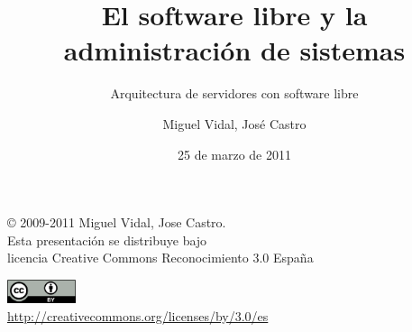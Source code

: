 \documentclass{beamer}
\begin{document}
\title{El software libre y la administración de sistemas}
\subtitle{Arquitectura de servidores con software libre}
\author{Miguel Vidal, José Castro}
\date{25 de marzo de 2011}


\begin{frame}
  \vspace{2cm}
  \begin{flushright}
    {\footnotesize \copyright{} 2009-2011 Miguel Vidal, Jose Castro.} \\
    \medskip
    {\scriptsize Esta presentación se distribuye bajo \\ licencia Creative Commons Reconocimiento 3.0 España}
  \end{flushright}
  \begin{center}
    \href{http://creativecommons.org/licenses/by/3.0/es}{\includegraphics[width=2cm]{format/cc-by.png}} \\
    {\tiny \url{http://creativecommons.org/licenses/by/3.0/es}}
  \end{center}
\end{frame}%

\end{document}
